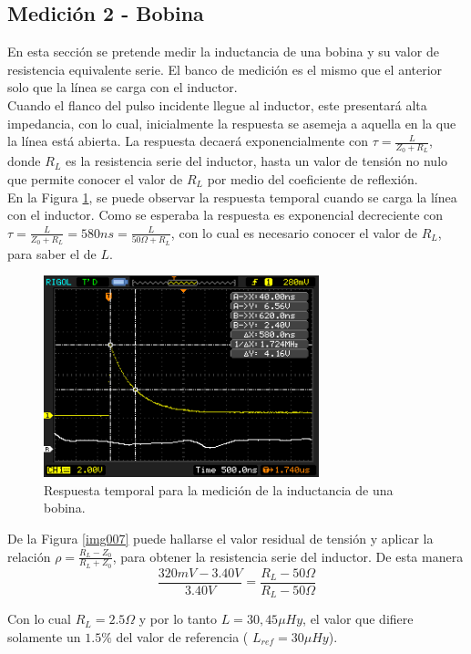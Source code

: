 \documentclass[a4paper,10pt]{article}
\begin{document}
						
	\subsection{Medición 2 - Bobina}
	\indent En esta secci\'on se pretende medir la inductancia de una bobina y
	su valor de resistencia equivalente serie. El banco de medici\'on es el 
	mismo que el anterior solo que la l\'inea se carga con el inductor. \\
	\indent Cuando el flanco del pulso incidente llegue al inductor, este 
	presentar\'a alta impedancia, con lo cual, inicialmente la respuesta se 
	asemeja a aquella en la que la l\'inea est\'a abierta. La respuesta 
	decaer\'a exponencialmente con $\tau=\frac{L}{Z_0+R_L}$, donde $R_L$ es la
	resistencia serie del inductor, hasta un valor de tensi\'on no nulo que 
	permite conocer el valor de $R_L$ por medio del coeficiente de 
	reflexi\'on. \\
	\indent En la Figura \ref{img006}, se puede observar la respuesta temporal
	cuando se carga la l\'inea con el inductor. Como se esperaba la respuesta
	es exponencial decreciente con 
	$\tau=\frac{L}{Z_0+R_L}=580ns=\frac{L}{50\Omega+R_L}$, con lo cual es 
	necesario conocer el valor de $R_L$, para saber el de $L$.
		
		\begin{figure}[!htb]
			\centering
			\includegraphics[width=8cm]
			{Imagenes/InductorL.png}
			\caption{Respuesta temporal para la medici\'on de la inductancia 
			de una bobina.}
			\label{img006}
		\end{figure}

	\indent De la Figura \ref{img007} puede hallarse el valor residual de 
	tensi\'on y aplicar la relaci\'on  $\rho=\frac{R_L-Z_0}{R_L+Z_0}$, para 
	obtener la resistencia serie del inductor. De esta manera 
	$$\frac{320mV-3.40V}{3.40V}=\frac{R_L-50\Omega}{R_L-50\Omega}$$
	
	\indent Con lo cual $R_L=2.5\Omega$ y por lo tanto $L=30,45\mu Hy$, el 
	valor que difiere solamente un $1.5\% $ del valor de referencia (
	$L_{ref}=30\mu Hy$).
	
\end{document}
